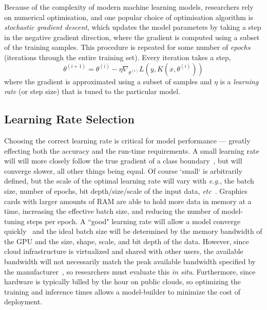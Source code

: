 \documentclass[conference]{IEEEtran}
\begin{document}
Because of the complexity of modern machine learning models, researchers rely on numerical optimisation, and one popular choice of optimisation algorithm is \textit{stochastic gradient descent}, which updates the model parameters by taking a step in the negative gradient direction, where the gradient is computed using a subset of the training samples.
This procedure is repeated for some number of \textit{epochs} (iterations through the entire training set). Every iteration takes a step,
\begin{equation}
    \theta^{(i+1)} = \theta^{(i)} - \eta \nabla_{\theta^{(i)}} L(y, K(x, \theta^{(i)}))
    \label{eq:sgd}
\end{equation}
where the gradient is approximated using a subset of samples and $\eta$ is a \textit{learning rate} (or step size) that is tuned to the particular model.



\subsection{Learning Rate Selection}
\label{learning_rate}

Choosing the correct learning rate is critical for model performance --- greatly effecting both the accuracy and the run-time requirements. A small learning rate will will more closely follow the true gradient of a class boundary~\cite{cao2019generalization}, but will converge slower, all other things being equal. Of course `small` is arbitrarily defined, but the scale of the optimal learning rate will vary with \textit{e.g.}, the batch size, number of epochs, bit depth/size/scale of the input data, \textit{etc}~\cite{granziol2022learning}. Graphics cards with larger amounts of RAM are able to hold more data in memory at a time, increasing the effective batch size, and reducing the number of model-tuning steps per epoch. A ``good" learning rate will allow a model converge quickly~\cite{smith2019super,granziol2022learning} and the ideal batch size will be determined by the memory bandwidth of the GPU and the size, shape, scale, and bit depth of the data. However, since cloud infrastructure is virtualized and shared with other users, the available bandwidth will not necessarily match the peak available bandwidth specified by the manufacturer~\cite{sajid2013cloud}, so researchers must evaluate this \textit{in situ}. Furthermore, since hardware is typically billed by the hour on public clouds, so optimizing the training and inference times allows a model-builder to minimize the cost of deployment. 
\end{document}
